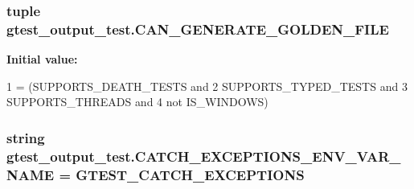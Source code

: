 \subsubsection[{\texorpdfstring{C\+A\+N\+\_\+\+G\+E\+N\+E\+R\+A\+T\+E\+\_\+\+G\+O\+L\+D\+E\+N\+\_\+\+F\+I\+LE}{CAN_GENERATE_GOLDEN_FILE}}]{\setlength{\rightskip}{0pt plus 5cm}tuple gtest\+\_\+output\+\_\+test.\+C\+A\+N\+\_\+\+G\+E\+N\+E\+R\+A\+T\+E\+\_\+\+G\+O\+L\+D\+E\+N\+\_\+\+F\+I\+LE}\hypertarget{namespacegtest__output__test_aa370a0da630f54a564d79507df196854}{}\label{namespacegtest__output__test_aa370a0da630f54a564d79507df196854}
{\bfseries Initial value\+:}
\begin{DoxyCode}
1 = (SUPPORTS\_DEATH\_TESTS \textcolor{keywordflow}{and}
2                             SUPPORTS\_TYPED\_TESTS \textcolor{keywordflow}{and}
3                             SUPPORTS\_THREADS \textcolor{keywordflow}{and}
4                             \textcolor{keywordflow}{not} IS\_WINDOWS)
\end{DoxyCode}
\subsubsection[{\texorpdfstring{C\+A\+T\+C\+H\+\_\+\+E\+X\+C\+E\+P\+T\+I\+O\+N\+S\+\_\+\+E\+N\+V\+\_\+\+V\+A\+R\+\_\+\+N\+A\+ME}{CATCH_EXCEPTIONS_ENV_VAR_NAME}}]{\setlength{\rightskip}{0pt plus 5cm}string gtest\+\_\+output\+\_\+test.\+C\+A\+T\+C\+H\+\_\+\+E\+X\+C\+E\+P\+T\+I\+O\+N\+S\+\_\+\+E\+N\+V\+\_\+\+V\+A\+R\+\_\+\+N\+A\+ME = \textquotesingle{}G\+T\+E\+S\+T\+\_\+\+C\+A\+T\+C\+H\+\_\+\+E\+X\+C\+E\+P\+T\+I\+O\+NS\textquotesingle{}}\hypertarget{namespacegtest__output__test_a3b2d61497a354f214b5a086dcff420ee}{}\label{namespacegtest__output__test_a3b2d61497a354f214b5a086dcff420ee}
